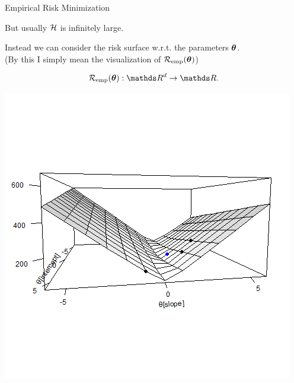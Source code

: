 \documentclass[11pt,compress,t,notes=noshow, xcolor=table]{beamer}
\begin{document}
\begin{vbframe}{Empirical Risk Minimization}

But usually $\mathcal{H}$ is infinitely large.

\lz

Instead we can consider the risk surface w.r.t. the parameters $\bm{\theta}$.\\
(By this I simply mean the visualization of $\mathcal{R}_{\text{emp}}(\bm{\theta})$)

\begin{table}
\begin{minipage}{0.4\linewidth}
$$\risket : \R^d \to \R.$$
\end{minipage}\hfill
	\begin{minipage}{0.55\linewidth}
\includegraphics[width=\textwidth]{figure/ml-basic-riskmin-error-surface.png}
\end{minipage}
\end{table}



\end{vbframe}
\end{document}
